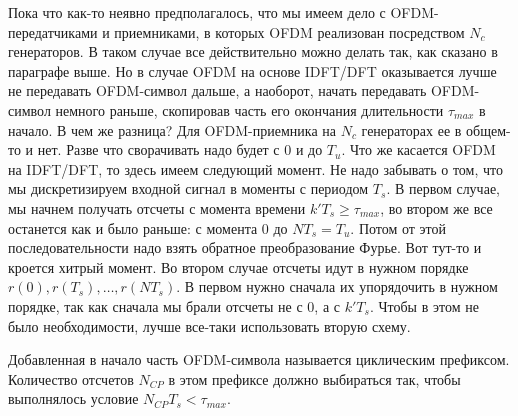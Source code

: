 \documentclass{book}
\numberwithin{theorem}{chapter}
\numberwithin{statement}{chapter}
\numberwithin{lemma}{chapter}
\theoremstyle{definition}
\numberwithin{task}{chapter}
\theoremstyle{remark}
\numberwithin{example}{chapter}
\theoremstyle{definition}
\numberwithin{definition}{chapter}
\theoremstyle{remark}
\theoremstyle{remark}
\numberwithin{lyrics}{section}
\begin{document}
Пока что как-то неявно предполагалось, что мы имеем дело с OFDM-передатчиками и приемниками, в которых OFDM реализован посредством $N_c$ генераторов. В таком случае все действительно можно делать так, как сказано в параграфе выше. Но в случае OFDM на основе IDFT/DFT оказывается лучше не передавать OFDM-символ дальше, а наоборот, начать передавать OFDM-символ немного раньше, скопировав часть его окончания длительности $\tau_{max}$ в начало. В чем же разница? Для OFDM-приемника на $N_c$ генераторах ее в общем-то и нет. Разве что сворачивать надо будет с 0 и до $T_u$. Что же касается OFDM на IDFT/DFT, то здесь имеем следующий момент. Не надо забывать о том, что мы дискретизируем входной сигнал в моменты с периодом $T_s$. В первом случае, мы начнем получать отсчеты с момента времени $k'T_s \ge \tau_{max}$, во втором же все останется как и было раньше: с момента 0 до $NT_s = T_u$. Потом от этой последовательности надо взять обратное преобразование Фурье. Вот тут-то и кроется хитрый момент. Во втором случае отсчеты идут в нужном порядке $r(0), r(T_s), \dots, r(NT_s)$. В первом нужно сначала их упорядочить в нужном порядке, так как сначала мы брали отсчеты не с 0, а с $k'T_s$. Чтобы в этом не было необходимости, лучше все-таки использовать вторую схему.

Добавленная в начало часть OFDM-символа называется циклическим префиксом. Количество отсчетов $N_{CP}$ в этом префиксе должно выбираться так, чтобы выполнялось условие $N_{CP} T_s < \tau_{max}$.
\end{document}
